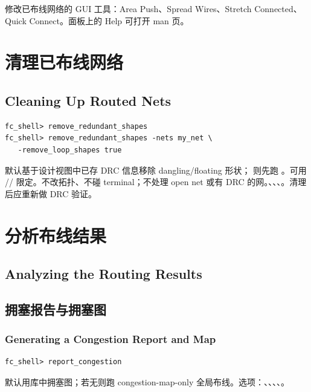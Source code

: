 修改已布线网络的 GUI 工具：Area Push、Spread Wires、Stretch Connected、Quick Connect。面板上的 Help 可打开 man 页。

\section{清理已布线网络}
\subsection*{Cleaning Up Routed Nets}

\begin{lstlisting}
fc_shell> remove_redundant_shapes
fc_shell> remove_redundant_shapes -nets my_net \
   -remove_loop_shapes true
\end{lstlisting}

默认基于设计视图中已存 DRC 信息移除 dangling/floating 形状； 则先跑 。可用 // 限定。不改拓扑、不碰 terminal；不处理 open net 或有 DRC 的网。、、、。清理后应重新做 DRC 验证。

\section{分析布线结果}
\subsection*{Analyzing the Routing Results}

\subsection{拥塞报告与拥塞图}
\subsubsection*{Generating a Congestion Report and Map}

\begin{lstlisting}
fc_shell> report_congestion
\end{lstlisting}

默认用库中拥塞图；若无则跑 congestion-map-only 全局布线。选项：、、、、。


